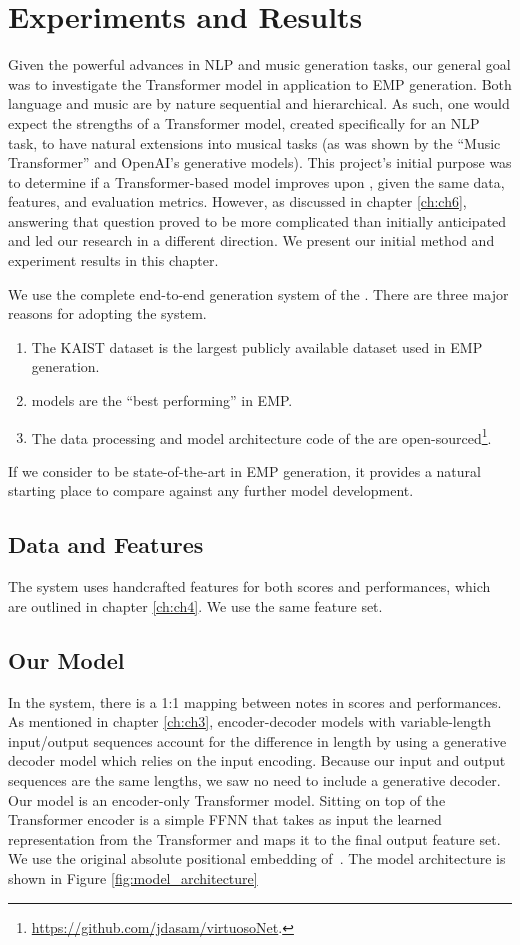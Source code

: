 \chapter{Experiments and Results}\label{ch:ch5}
Given the powerful advances in NLP and music generation tasks, our general goal was to investigate the Transformer model in application to EMP generation. Both language and music are by nature sequential and hierarchical. As such, one would expect the strengths of a Transformer model, created specifically for an NLP task, to have natural extensions into musical tasks (as was shown by the ``Music Transformer'' and OpenAI's generative models).  This project's initial purpose was to determine if a Transformer-based model improves upon \vnet{}, given the same data, features, and evaluation metrics. However, as discussed in chapter \ref{ch:ch6}, answering that question proved to be more complicated than initially anticipated and led our research in a different direction. We present our initial method and experiment results in this chapter. 

We use the complete end-to-end generation system of the \vnetf{}. There are three major reasons for adopting the \vnet{} system. 
\begin{enumerate}
    \item The KAIST dataset is the largest publicly available dataset used in EMP generation.
    \item \vnet{} models are the ``best performing'' in EMP.
    \item The data processing and model architecture code of the \vnetf{} are open-sourced\footnote{\url{https://github.com/jdasam/virtuosoNet}.}.
\end{enumerate}
If we consider \vnet{} to be state-of-the-art in EMP generation, it provides a natural starting place to compare against any further model development. 

\section{Data and Features}
The \vnet{} system uses handcrafted features for both scores and performances, which are outlined in chapter \ref{ch:ch4}. We use the same feature set.

\section{Our Model}
In the \vnet{} system, there is a 1:1 mapping between notes in scores and performances. As mentioned in chapter \ref{ch:ch3}, encoder-decoder \seq{} models with variable-length input/output sequences account for the difference in length by using a generative decoder model which relies on the input encoding. Because our input and output sequences are the same lengths, we saw no need to include a generative decoder. Our model is an encoder-only Transformer model. Sitting on top of the Transformer encoder is a simple FFNN that takes as input the learned representation from the Transformer and maps it to the final output feature set. We use the original absolute positional embedding of~\citet{vaswani2017attention}. The model architecture is shown in Figure \ref{fig:model_architecture}


